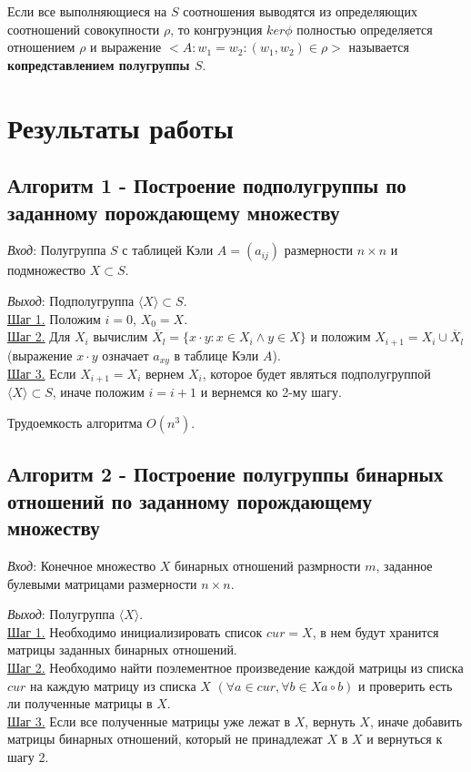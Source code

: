 \documentclass[spec, och, labwork]{shiza}
\begin{document}
Если все выполняющиеся на $S$ соотношения выводятся из определяющих соотношений совокупности $\rho$, то конгруэнция $ker\phi$
полностью определяется отношением $\rho$ и выражение $<A: {w_1 = w_2 : (w_1, w_2) \in \rho}>$ называется \textbf{копредставлением полугруппы $S$}.

\section{Результаты работы}

    \subsection{Алгоритм 1 - Построение подполугруппы по заданному порождающему множеству}

        \textit{Вход}: Полугруппа $S$ с таблицей Кэли $A = (a_{ij})$ размерности $n \times n$ и подмножество $X \subset S$.

        \textit{Выход}: Подполугруппа $\langle X \rangle \subset S$.\\
        \underline{Шаг 1.} Положим $i = 0$, $X_0 = X$.\\
        \underline{Шаг 2.} Для $X_i$ вычислим $\overline{X}_l = \{x \cdot y : x \in X_i \wedge y \in X \}$ и положим $X_{i + 1} = X_i \cup \overline{X}_l$ (выражение $x \cdot y$ означает $a_{xy}$ в таблице Кэли $A$). \\
        \underline{Шаг 3.} Если $X_{i + 1} = X_i$ вернем $X_i$, которое будет являться подполугруппой $\langle X \rangle \subset S$, иначе положим $i=i+1$ и вернемся ко 2-му шагу.
    
        Трудоемкость алгоритма $O(n^3)$.

    \subsection{Алгоритм 2 - Построение полугруппы бинарных отношений по заданному порождающему множеству}

        \textit{Вход}: Конечное множество $X$ бинарных отношений размрности $m$, заданное булевыми матрицами размерности $n \times n$.

        \textit{Выход}: Полугруппа $\langle X \rangle$.\\
        \underline{Шаг 1.} Необходимо инициализировать список $cur = X$, в нем будут хранится матрицы заданных бинарных отношений.\\
        \underline{Шаг 2.} Необходимо найти поэлементное произведение каждой матрицы из списка $cur$ на каждую матрицу из списка $X$ $(\forall a \in cur, \forall b \in X a \circ b)$
         и проверить есть ли полученные матрицы в $X$.\\
        \underline{Шаг 3.} Если все полученные матрицы уже лежат в $X$, вернуть $X$, иначе добавить матрицы бинарных отношений, который не принадлежат $X$ в $X$ и вернуться к шагу 2.
\end{document}
